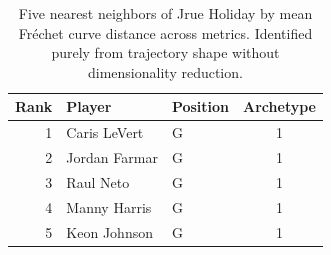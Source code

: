 \begin{table}[htbp]
  \centering\small
  \begin{tabular}{rllc}
    \toprule
    Rank & Player & Position & Archetype \\
    \midrule
    1 & Caris LeVert & G & 1 \\
    2 & Jordan Farmar & G & 1 \\
    3 & Raul Neto & G & 1 \\
    4 & Manny Harris & G & 1 \\
    5 & Keon Johnson & G & 1 \\
    \bottomrule
  \end{tabular}
  \caption{Five nearest neighbors of Jrue Holiday by mean Fr\'{e}chet curve distance across metrics. Identified purely from trajectory shape without dimensionality reduction.}
  \label{tab:Jrue_Holiday_frechet_curve_neighbors}
\end{table}

